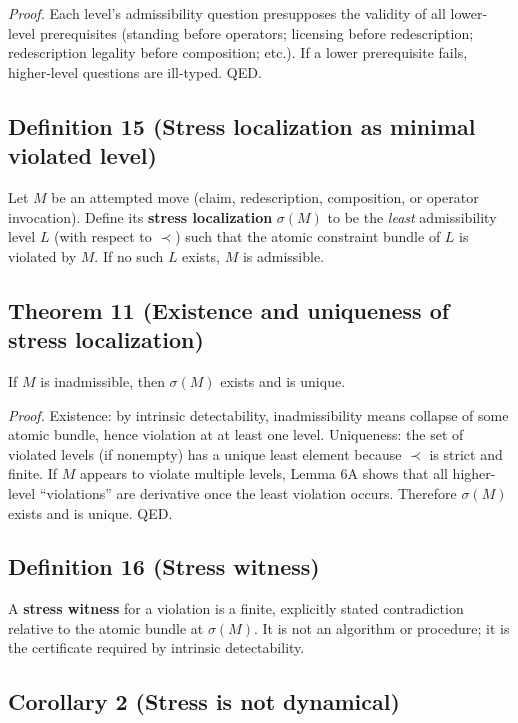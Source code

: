 \documentclass[12pt]{article}
\theoremstyle{plain}
\begin{document}
\textit{Proof.} Each level's admissibility question presupposes the validity of all lower-level prerequisites (standing before operators; licensing before redescription; redescription legality before composition; etc.). If a lower prerequisite fails, higher-level questions are ill-typed. QED.

\subsection{Definition 15 (Stress localization as minimal violated level)}

Let $M$ be an attempted move (claim, redescription, composition, or operator invocation). Define its \textbf{stress localization} $\sigma(M)$ to be the \emph{least} admissibility level $L$ (with respect to $\prec$) such that the atomic constraint bundle of $L$ is violated by $M$. If no such $L$ exists, $M$ is admissible.

\subsection{Theorem 11 (Existence and uniqueness of stress localization)}

If $M$ is inadmissible, then $\sigma(M)$ exists and is unique.

\textit{Proof.} Existence: by intrinsic detectability, inadmissibility means collapse of some atomic bundle, hence violation at at least one level. Uniqueness: the set of violated levels (if nonempty) has a unique least element because $\prec$ is strict and finite. If $M$ appears to violate multiple levels, Lemma 6A shows that all higher-level ``violations'' are derivative once the least violation occurs. Therefore $\sigma(M)$ exists and is unique. QED.

\subsection{Definition 16 (Stress witness)}

A \textbf{stress witness} for a violation is a finite, explicitly stated contradiction relative to the atomic bundle at $\sigma(M)$. It is not an algorithm or procedure; it is the certificate required by intrinsic detectability.

\subsection{Corollary 2 (Stress is not dynamical)}
\end{document}
